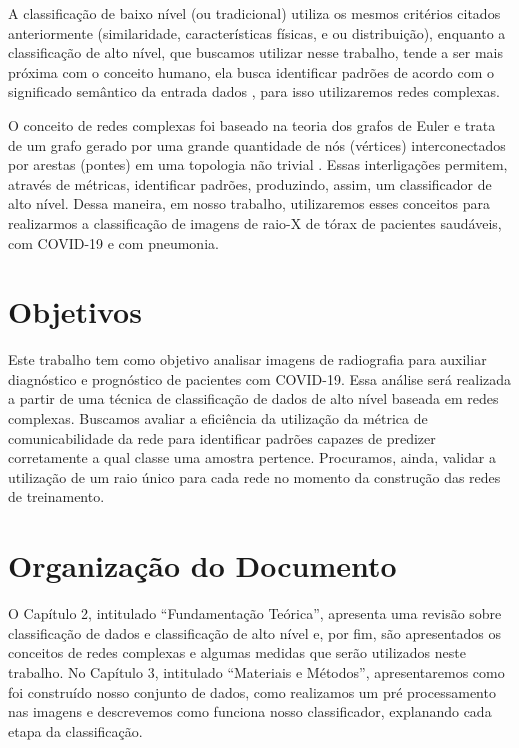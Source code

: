 \documentclass[
12pt,        %
oneside,     %
a4paper,     %
english,       %
brazil        %
%
%
]{ppgca}
\begin{document}
A classificação de baixo nível (ou tradicional) utiliza os mesmos critérios citados anteriormente (similaridade, características físicas, e ou distribuição), enquanto a classificação de alto nível, que buscamos utilizar nesse trabalho, tende a ser mais próxima com o conceito humano, ela busca identificar padrões de acordo com o significado semântico da entrada dados \cite{Colliri2018}, para isso utilizaremos redes complexas. 

O conceito de redes complexas foi baseado na teoria dos grafos de Euler e trata de um grafo gerado por uma grande quantidade de nós (vértices) interconectados por arestas (pontes) em uma topologia não trivial \cite{AlbertBarabasi1999, AlbertBarabasi2002, Newman_2003, Silva2016, ThompsonEtAl}. Essas interligações permitem, através de métricas, identificar padrões, produzindo, assim, um classificador de alto nível. Dessa maneira, em nosso trabalho, utilizaremos esses conceitos para realizarmos a classificação de imagens de raio-X de tórax de pacientes saudáveis, com COVID-19 e com pneumonia. 

\section{Objetivos}
Este trabalho tem como objetivo analisar imagens de radiografia para auxiliar diagnóstico e prognóstico de pacientes com COVID-19. Essa análise será realizada a partir de uma técnica de classificação de dados de alto nível baseada em redes complexas. Buscamos avaliar a eficiência da utilização da métrica de comunicabilidade da rede para identificar padrões capazes de predizer corretamente a qual classe uma amostra pertence. Procuramos, ainda, validar a utilização de um raio único para cada rede no momento da construção das redes de treinamento.

\section{Organização do Documento}
O Capítulo 2, intitulado “Fundamentação Teórica”, apresenta uma revisão sobre classificação de dados e classificação de alto nível e, por fim, são apresentados os conceitos de redes complexas e algumas medidas que serão utilizados neste trabalho.
No Capítulo 3, intitulado “Materiais e Métodos”, apresentaremos como foi construído nosso conjunto de dados, como realizamos um pré processamento nas imagens e descrevemos como funciona nosso classificador, explanando cada etapa da classificação. 
\end{document}
